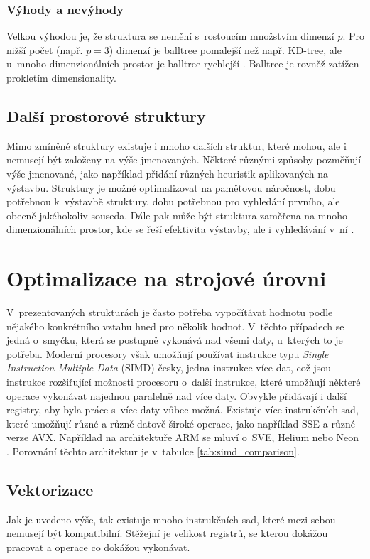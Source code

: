 \subsubsection{Výhody a nevýhody}
Velkou výhodou je, že struktura se nemění s~rostoucím množstvím dimenzí $p$. Pro nižší počet (např. $p=3$) dimenzí je balltree pomalejší než např. KD-tree, ale u~mnoho dimenzionálních prostor je balltree rychlejší \cite{knn-survey}. Balltree je rovněž zatížen prokletím dimensionality.



\subsection*{Další prostorové struktury}
Mimo zmíněné struktury existuje i mnoho dalších struktur, které mohou, ale i nemusejí být založeny na výše jmenovaných. Některé různými způsoby pozměňují výše jmenované, jako například přidání různých heuristik aplikovaných na výstavbu. Struktury je možné optimalizovat na paměťovou náročnost, dobu potřebnou k~výstavbě struktury, dobu potřebnou pro vyhledání prvního, ale obecně jakéhokoliv souseda. Dále pak může být struktura zaměřena na mnoho dimenzionálních prostor, kde se řeší efektivita výstavby, ale i vyhledávání v~ní \cite{reviewNN}.

\section{Optimalizace na strojové úrovni}
V~prezentovaných strukturách je často potřeba vypočítávat hodnotu podle nějakého konkrétního vztahu hned pro několik hodnot. V~těchto případech se jedná o~smyčku, která se postupně vykonává nad všemi daty, u~kterých to je potřeba. Moderní procesory však umožňují používat instrukce typu \emph{Single Instruction Multiple Data} (SIMD) česky, jedna instrukce více dat, což jsou instrukce rozšiřující možnosti procesoru o~další instrukce, které umožňují některé operace vykonávat najednou paralelně nad více daty. Obvykle přidávají i další registry, aby byla práce s~více daty vůbec možná. Existuje více instrukčních sad, které umožňují různé a různě datově široké operace, jako například SSE a různé verze AVX. Například na architektuře ARM se mluví o~SVE, Helium nebo Neon \cite{ARM_helium,ARM_Neon,ARM_SVE}. Porovnání těchto architektur je v~tabulce \ref{tab:simd_comparison}.

\subsection*{Vektorizace}
Jak je uvedeno výše, tak existuje mnoho instrukčních sad, které mezi sebou nemusejí být kompatibilní. Stěžejní je velikost registrů, se kterou dokážou pracovat a operace co dokážou vykonávat.

